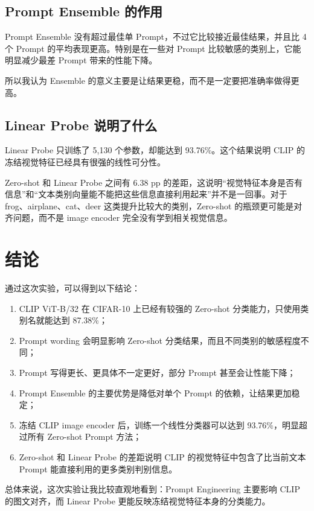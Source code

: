 \documentclass[UTF8,11pt,a4paper]{ctexart}
\begin{document}
\subsection{Prompt Ensemble 的作用}

Prompt Ensemble 没有超过最佳单 Prompt，不过它比较接近最佳结果，并且比 4 个 Prompt 的平均表现更高。特别是在一些对 Prompt 比较敏感的类别上，它能明显减少最差 Prompt 带来的性能下降。

所以我认为 Ensemble 的意义主要是让结果更稳，而不是一定要把准确率做得更高。

\subsection{Linear Probe 说明了什么}

Linear Probe 只训练了 5,130 个参数，却能达到 93.76\%。这个结果说明 CLIP 的冻结视觉特征已经具有很强的线性可分性。

Zero-shot 和 Linear Probe 之间有 6.38 pp 的差距，这说明“视觉特征本身是否有信息”和“文本类别向量能不能把这些信息直接利用起来”并不是一回事。对于 frog、airplane、cat、deer 这类提升比较大的类别，Zero-shot 的瓶颈更可能是对齐问题，而不是 image encoder 完全没有学到相关视觉信息。

\section{结论}

通过这次实验，可以得到以下结论：

\begin{enumerate}[leftmargin=2.3em]
    \item CLIP ViT-B/32 在 CIFAR-10 上已经有较强的 Zero-shot 分类能力，只使用类别名就能达到 87.38\%；
    \item Prompt wording 会明显影响 Zero-shot 分类结果，而且不同类别的敏感程度不同；
    \item Prompt 写得更长、更具体不一定更好，部分 Prompt 甚至会让性能下降；
    \item Prompt Ensemble 的主要优势是降低对单个 Prompt 的依赖，让结果更加稳定；
    \item 冻结 CLIP image encoder 后，训练一个线性分类器可以达到 93.76\%，明显超过所有 Zero-shot Prompt 方法；
    \item Zero-shot 和 Linear Probe 的差距说明 CLIP 的视觉特征中包含了比当前文本 Prompt 能直接利用的更多类别判别信息。
\end{enumerate}

总体来说，这次实验让我比较直观地看到：Prompt Engineering 主要影响 CLIP 的图文对齐，而 Linear Probe 更能反映冻结视觉特征本身的分类能力。
\end{document}
